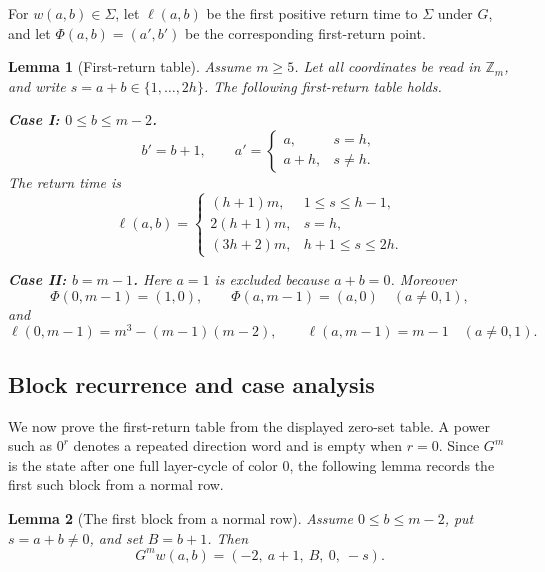 \documentclass[11pt]{article}
\newtheorem{lemma}{Lemma}
\theoremstyle{definition}
\begin{document}
For \(w(a,b)\in\Sigma\), let \(\ell(a,b)\) be the first positive return time to \(\Sigma\) under \(G\),
and let \(\Phi(a,b)=(a',b')\) be the corresponding first-return point.

\begin{lemma}[First-return table]\label{lem:firstreturn}
Assume \(m\ge5\).  Let all coordinates be read in \(\mathbb Z_m\), and write
\(s=a+b\in\{1,\ldots,2h\}\).  The following first-return table holds.

\medskip\noindent
\textbf{Case I: \(0\le b\le m-2\).}
\[
b'=b+1,
\qquad
 a'=\begin{cases}
 a,&s=h,\\
 a+h,&s\ne h.
 \end{cases}
\]
The return time is
\[
\ell(a,b)=
\begin{cases}
(h+1)m, & 1\le s\le h-1,\\
2(h+1)m, & s=h,\\
(3h+2)m, & h+1\le s\le 2h.
\end{cases}
\]

\medskip\noindent
\textbf{Case II: \(b=m-1\).}
Here \(a=1\) is excluded because \(a+b=0\).  Moreover
\[
\Phi(0,m-1)=(1,0),
\qquad
\Phi(a,m-1)=(a,0)\quad(a\ne0,1),
\]
and
\[
\ell(0,m-1)=m^3-(m-1)(m-2),
\qquad
\ell(a,m-1)=m-1\quad(a\ne0,1).
\]
\end{lemma}


\subsection{Block recurrence and case analysis}

We now prove the first-return table from the displayed zero-set table.  A power such as \(0^r\)
denotes a repeated direction word and is empty when \(r=0\).  Since \(G^m\) is the state after one full
layer-cycle of color 0, the following lemma records the first such block from a normal row.

\begin{lemma}[The first block from a normal row]\label{lem:firstblock}
Assume \(0\le b\le m-2\), put \(s=a+b\ne0\), and set \(B=b+1\).  Then
\[
G^m w(a,b)=(-2,\ a+1,\ B,\ 0,\ -s).
\]
\end{lemma}
\end{document}
